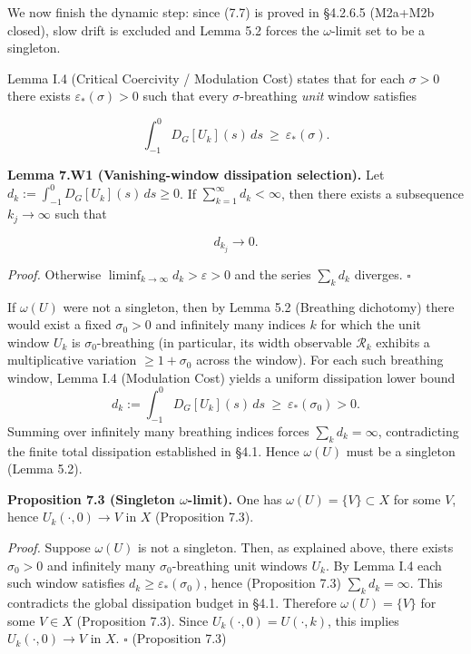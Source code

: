 \documentclass[
  11pt,
]{article}
\begin{document}
We now finish the dynamic step: since (7.7) is proved in §4.2.6.5 (M2a+M2b closed), slow drift is excluded and Lemma 5.2 forces the \(\omega\)-limit set to be a singleton.

Lemma I.4 (Critical Coercivity / Modulation Cost) states that for each \(\sigma>0\) there exists \(\varepsilon_*(\sigma)>0\) such that every \(\sigma\)-breathing \emph{unit} window satisfies

\begin{equation}
\int_{-1}^{0} D_G[U_k](s)\,ds \ \ge\ \varepsilon_*(\sigma).
\tag{7.11}
\end{equation}

\textbf{Lemma 7.W1 (Vanishing-window dissipation selection).} Let \(d_k:=\int_{-1}^{0} D_G[U_k](s)\,ds\ge 0\). If \(\sum_{k=1}^\infty d_k<\infty\), then there exists a subsequence \(k_j\to\infty\) such that

\begin{equation}
d_{k_j}\longrightarrow 0.
\tag{7.W1}\label{eq:7W1_vanishing_window}
\end{equation}

\emph{Proof.} Otherwise \(\liminf_{k\to\infty} d_k>\varepsilon>0\) and the series \(\sum_k d_k\) diverges. \(\square\)

If \(\omega(U)\) were not a singleton, then by Lemma 5.2 (Breathing dichotomy) there would exist a fixed \(\sigma_0>0\) and infinitely many indices \(k\) for which the unit window \(U_k\) is \(\sigma_0\)-breathing (in particular, its width observable \(\mathcal R_k\) exhibits a multiplicative variation \(\ge 1+\sigma_0\) across the window). For each such breathing window, Lemma I.4 (Modulation Cost) yields a uniform dissipation lower bound \[
d_k:=\int_{-1}^{0} D_G[U_k](s)\,ds \ \ge\ \varepsilon_*(\sigma_0)>0.
\] Summing over infinitely many breathing indices forces \(\sum_k d_k=\infty\), contradicting the finite total dissipation established in §4.1. Hence \(\omega(U)\) must be a singleton (Lemma 5.2).

\textbf{Proposition 7.3 (Singleton \(\omega\)-limit).} One has \(\omega(U)=\{V\}\subset X\) for some \(V\), hence \(U_k(\cdot,0)\to V\) in \(X\) (Proposition 7.3).

\emph{Proof.} Suppose \(\omega(U)\) is not a singleton. Then, as explained above, there exists \(\sigma_0>0\) and infinitely many \(\sigma_0\)-breathing unit windows \(U_k\). By Lemma I.4 each such window satisfies \(d_k\ge\varepsilon_*(\sigma_0)\), hence (Proposition 7.3) \(\sum_k d_k=\infty\). This contradicts the global dissipation budget in §4.1. Therefore \(\omega(U)=\{V\}\) for some \(V\in X\) (Proposition 7.3). Since \(U_k(\cdot,0)=U(\cdot,k)\), this implies \(U_k(\cdot,0)\to V\) in \(X\). \(\square\) (Proposition 7.3)
\end{document}
